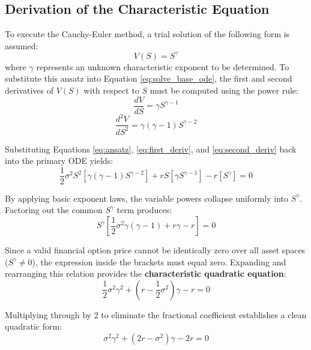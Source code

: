 \documentclass[12pt]{article}
\theoremstyle{definition}
\numberwithin{equation}{section}
\begin{document}
\subsection{Derivation of the Characteristic Equation}
To execute the Cauchy-Euler method, a trial solution of the following form is assumed:
\begin{equation}\label{eq:ansatz}
V(S) = S^\gamma
\end{equation}
where $\gamma$ represents an unknown characteristic exponent to be determined. To substitute this ansatz into Equation \eqref{eq:solve_base_ode}, the first and second derivatives of $V(S)$ with respect to $S$ must be computed using the power rule:
\begin{equation}\label{eq:first_deriv}
\frac{dV}{dS} = \gamma S^{\gamma-1}
\end{equation}
\begin{equation}\label{eq:second_deriv}
\frac{d^2 V}{dS^2} = \gamma(\gamma-1)S^{\gamma-2}
\end{equation}

Substituting Equations \eqref{eq:ansatz}, \eqref{eq:first_deriv}, and \eqref{eq:second_deriv} back into the primary ODE yields:
\begin{equation}
\frac{1}{2}\sigma^2 S^2 \left[ \gamma(\gamma-1)S^{\gamma-2} \right] + rS \left[ \gamma S^{\gamma-1} \right] - r\left[ S^\gamma \right] = 0
\end{equation}

By applying basic exponent laws, the variable powers collapse uniformly into $S^\gamma$.
Factoring out the common $S^\gamma$ term produces:
\begin{equation}
S^\gamma \left[ \frac{1}{2}\sigma^2 \gamma(\gamma-1) + r\gamma - r \right] = 0
\end{equation}

Since a valid financial option price cannot be identically zero over all asset spaces ($S^\gamma \neq 0$), the expression inside the brackets must equal zero. Expanding and rearranging this relation provides the \textbf{characteristic quadratic equation}:
\begin{equation}\label{eq:characteristic_quad}
\frac{1}{2}\sigma^2 \gamma^2 + \left(r - \frac{1}{2}\sigma^2\right)\gamma - r = 0
\end{equation}

Multiplying through by 2 to eliminate the fractional coefficient establishes a clean quadratic form:
\begin{equation}
\sigma^2 \gamma^2 + (2r - \sigma^2)\gamma - 2r = 0
\end{equation}
\end{document}
